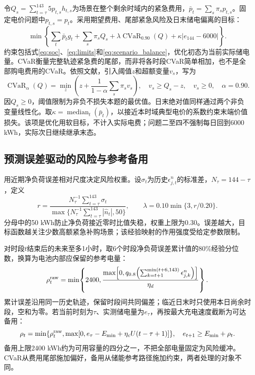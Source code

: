 令$Q_s=\sum_{t=\tau}^{143}5p_{t,s}h_{t,s}$为场景在整个剩余时域内的紧急费用，$\bar p_t=\sum_s\pi_sp_{t,s}$。固定电价问题中$p_{t,s}=p_t$。采用期望费用、尾部紧急风险及日末储电偏离的目标：
\begin{equation}
 \min\left\{\sum_t\bar p_tg_t+\sum_s\pi_sQ_s
 +\lambda\operatorname{CVaR}_{0.90}(Q)
 +\kappa|e_{144}-6000|\right\}.
 \label{eq:q2_objective}
\end{equation}
约束包括式\eqref{eq:soc}、\eqref{eq:limits}和\eqref{eq:scenario_balance}，优化初态为当前实际储电量。CVaR衡量完整轨迹紧急费的尾部，而非将各时段CVaR简单相加，也不是全部购电费用的CVaR。依照文献\cite{rockafellar2000}，引入阈值$z$和超额变量$v_s$，写为
\begin{equation}
 \operatorname{CVaR}_{\alpha}(Q)
 =\min_z\left(z+\frac{1}{1-\alpha}\sum_s\pi_sv_s\right),
 \quad v_s\ge Q_s-z,\quad v_s\ge0,
 \quad\alpha=0.90.
 \label{eq:cvar}
\end{equation}
因$Q_s\ge0$，阈值限制为非负不损失本题的最优值。日末绝对值同样通过两个非负变量线性化。取$\kappa=\operatorname{median}_{t}(\bar p_t)$，以接近本时域典型电价的系数约束末端价值损失。该项是优化用软目标，不计入实际电费；问题二至四不强制每日回到6000 kWh，实际次日继续继承末态。

\subsection{预测误差驱动的风险与参考备用}

用近期净负荷误差相对尺度决定风险权重。设$\sigma_t$为历史$\epsilon^n_{j,t}$的标准差，$N_\tau=144-\tau$，定义
\begin{equation}
 r=\frac{N_\tau^{-1}\sum_{t=\tau}^{143}\sigma_t}
 {\max\{N_\tau^{-1}\sum_{t=\tau}^{143}|\widehat n_t|,50\}},
 \qquad \lambda=0.10\min\{3,r/0.20\}.
 \label{eq:risk_weight}
\end{equation}
分母中的50 kWh防止净负荷接近零时比值失稳，权重上限为0.30。误差越大，目标函数越关注少数高额紧急补购场景；该经验映射的作用强度受给定参数限制。

对时段$t$结束后的未来至多1小时，取6个时段净负荷误差累计值的80\%经验分位数，换算为电池内部应保留的参考电量：
\begin{equation}
 \rho_t^{\rm raw}=\min\!\left\{2400,
 \frac{\max\!\left[0,q_{0.8}\!\left(\sum_{k=t+1}^{\min(t+6,143)}\epsilon^n_{j,k}\right)\right]}{\eta_d}\right\}.
 \label{eq:reserve}
\end{equation}
累计误差沿用同一历史轨迹，保留时段间共同偏差；临近日末时只使用本日尚余时段，空和为零。若当前时刻为$\tau$、实测储电量为$e_\tau$，再按最大充电速度截断为可达备用：
\begin{equation}
 \rho_t=\min\{\rho_t^{\rm raw},
 \max[0,e_\tau-E_{\min}+\eta_cU(t-\tau+1)]\},\quad
 e_{t+1}\ge E_{\min}+\rho_t.
 \label{eq:reachable_reserve}
\end{equation}
备用上限2400 kWh约为可用容量的四分之一，不把全部电量固定为风险缓冲。CVaR从费用尾部施加偏好，备用从储能参考路径施加约束，两者处理的对象不同。

